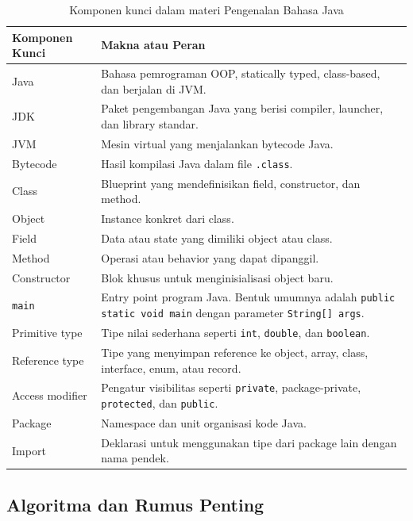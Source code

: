 \begin{table}[H]
\centering
\begin{tabularx}{\textwidth}{|L{0.28\textwidth}|X|}
\hline
\textbf{Komponen Kunci} & \textbf{Makna atau Peran} \\
\hline
Java & Bahasa pemrograman OOP, statically typed, class-based, dan berjalan di JVM. \\
\hline
JDK & Paket pengembangan Java yang berisi compiler, launcher, dan library standar. \\
\hline
JVM & Mesin virtual yang menjalankan bytecode Java. \\
\hline
Bytecode & Hasil kompilasi Java dalam file \texttt{.class}. \\
\hline
Class & Blueprint yang mendefinisikan field, constructor, dan method. \\
\hline
Object & Instance konkret dari class. \\
\hline
Field & Data atau state yang dimiliki object atau class. \\
\hline
Method & Operasi atau behavior yang dapat dipanggil. \\
\hline
Constructor & Blok khusus untuk menginisialisasi object baru. \\
\hline
\texttt{main} & Entry point program Java. Bentuk umumnya adalah \texttt{public static void main} dengan parameter \texttt{String[] args}. \\
\hline
Primitive type & Tipe nilai sederhana seperti \texttt{int}, \texttt{double}, dan \texttt{boolean}. \\
\hline
Reference type & Tipe yang menyimpan reference ke object, array, class, interface, enum, atau record. \\
\hline
Access modifier & Pengatur visibilitas seperti \texttt{private}, package-private, \texttt{protected}, dan \texttt{public}. \\
\hline
Package & Namespace dan unit organisasi kode Java. \\
\hline
Import & Deklarasi untuk menggunakan tipe dari package lain dengan nama pendek. \\
\hline
\end{tabularx}
\caption{Komponen kunci dalam materi Pengenalan Bahasa Java}
\label{tab:komponen-kunci-pengenalan-java}
\end{table}

\subsection{Algoritma dan Rumus Penting}

